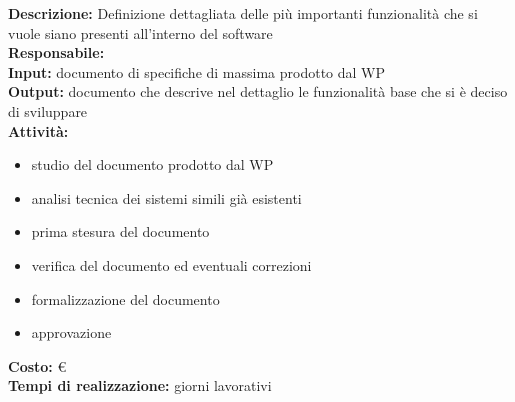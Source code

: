 \textbf{Descrizione:} Definizione dettagliata delle più importanti funzionalità che si vuole siano presenti all'interno del software\\
\linebreak
\textbf{Responsabile:} \\
\linebreak
\textbf{Input:} documento di specifiche di massima prodotto dal WP \\
\linebreak
\textbf{Output:} documento che descrive nel dettaglio le funzionalità base che si è deciso di sviluppare \\
\linebreak
\textbf{Attività:}
\begin{itemize}
\item studio del documento prodotto dal WP
\item analisi tecnica dei sistemi simili già esistenti
\item prima stesura del documento
\item verifica del documento ed eventuali correzioni
\item formalizzazione del documento
\item approvazione
\end{itemize}
\textbf{Costo:}  \euro \\
\textbf{Tempi di realizzazione:}  giorni lavorativi\\


